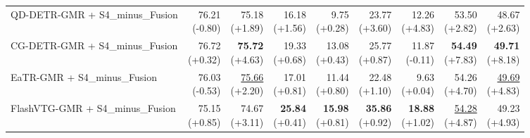 \documentclass{article}
\begin{document}
\begin{table}[ht]
{\begin{tabular}{lrrrrrrrr}
QD-DETR-GMR + S4\_minus\_Fusion & \shortstack{76.21 \\ {\scriptsize (-0.80)}} & \shortstack{75.18 \\ {\scriptsize (+1.89)}} & \shortstack{16.18 \\ {\scriptsize (+1.56)}} & \shortstack{9.75 \\ {\scriptsize (+0.28)}} & \shortstack{23.77 \\ {\scriptsize (+3.60)}} & \shortstack{12.26 \\ {\scriptsize (+4.83)}} & \shortstack{53.50 \\ {\scriptsize (+2.82)}} & \shortstack{48.67 \\ {\scriptsize (+2.63)}} \\
CG-DETR-GMR + S4\_minus\_Fusion & \shortstack{76.72 \\ {\scriptsize (+0.32)}} & \shortstack{\textbf{75.72} \\ {\scriptsize (+4.63)}} & \shortstack{19.33 \\ {\scriptsize (+0.68)}} & \shortstack{13.08 \\ {\scriptsize (+0.43)}} & \shortstack{25.77 \\ {\scriptsize (+0.87)}} & \shortstack{11.87 \\ {\scriptsize (-0.11)}} & \shortstack{\textbf{54.49} \\ {\scriptsize (+7.83)}} & \shortstack{\textbf{49.71} \\ {\scriptsize (+8.18)}} \\
EaTR-GMR + S4\_minus\_Fusion & \shortstack{76.03 \\ {\scriptsize (-0.53)}} & \shortstack{\underline{75.66} \\ {\scriptsize (+2.20)}} & \shortstack{17.01 \\ {\scriptsize (+0.81)}} & \shortstack{11.44 \\ {\scriptsize (+0.80)}} & \shortstack{22.48 \\ {\scriptsize (+1.10)}} & \shortstack{9.63 \\ {\scriptsize (+0.04)}} & \shortstack{54.26 \\ {\scriptsize (+4.70)}} & \shortstack{\underline{49.69} \\ {\scriptsize (+4.83)}} \\
FlashVTG-GMR + S4\_minus\_Fusion & \shortstack{75.15 \\ {\scriptsize (+0.85)}} & \shortstack{74.67 \\ {\scriptsize (+3.11)}} & \shortstack{\textbf{25.84} \\ {\scriptsize (+0.41)}} & \shortstack{\textbf{15.98} \\ {\scriptsize (+0.81)}} & \shortstack{\textbf{35.86} \\ {\scriptsize (+0.92)}} & \shortstack{\textbf{18.88} \\ {\scriptsize (+1.02)}} & \shortstack{\underline{54.28} \\ {\scriptsize (+4.87)}} & \shortstack{49.23 \\ {\scriptsize (+4.93)}} \\

\end{tabular}}
\end{table}
\end{document}
